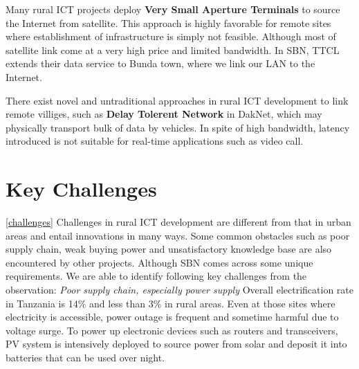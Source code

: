 Many rural ICT projects deploy \textbf{Very Small Aperture Terminals} to source the Internet from satellite. This approach is highly favorable for remote sites where establishment of infrastructure is simply not feasible. Although most of satellite link come at a very high price and limited bandwidth. In SBN, TTCL extends their data service to Bunda town, where we link our LAN to the Internet.

There exist novel and untraditional approaches in rural ICT development to link remote villiges, such as \textbf{Delay Tolerent Network} in DakNet\cite{pentland2004daknet}, which may physically transport bulk of data by vehicles. In spite of high bandwidth, latency introduced is not suitable for real-time applications such as video call.

\section{Key Challenges}\ref{challenges}
Challenges in rural ICT development are different from that in urban areas and entail innovations in many ways. Some common obstacles such as poor supply chain, weak buying power and unsatisfactory knowledge base are also encountered by other projects. Although SBN comes across some unique requirements. We are able to identify following key challenges from the observation:
\textit{Poor supply chain, especially power supply}
Overall electrification rate in Tanzania is 14\% and less than 3\% in rural areas. Even at those sites where electricity is accessible, power outage is frequent and sometime harmful due to voltage surge. To power up electronic devices such as routers and transceivers, PV system is intensively deployed to source power from solar and deposit it into batteries that can be used over night.

